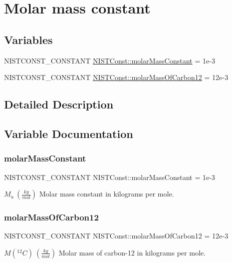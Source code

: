 \hypertarget{group___n_i_s_t_const-_molar_mass_constant}{}\section{Molar mass constant}
\label{group___n_i_s_t_const-_molar_mass_constant}
\subsection*{Variables}
\begin{DoxyCompactItemize}
\item 
N\+I\+S\+T\+C\+O\+N\+S\+T\+\_\+\+C\+O\+N\+S\+T\+A\+NT \mbox{\hyperlink{group___n_i_s_t_const-_molar_mass_constant_gaf82ba48d26910f7aead29d2390058327}{N\+I\+S\+T\+Const\+::molar\+Mass\+Constant}} = 1e-\/3
\item 
N\+I\+S\+T\+C\+O\+N\+S\+T\+\_\+\+C\+O\+N\+S\+T\+A\+NT \mbox{\hyperlink{group___n_i_s_t_const-_molar_mass_constant_gad9065879bcb5df86d887c5c547b7ab17}{N\+I\+S\+T\+Const\+::molar\+Mass\+Of\+Carbon12}} = 12e-\/3
\end{DoxyCompactItemize}


\subsection{Detailed Description}


\subsection{Variable Documentation}
\mbox{\label{group___n_i_s_t_const-_molar_mass_constant_gaf82ba48d26910f7aead29d2390058327}} 
\subsubsection{\texorpdfstring{molar\+Mass\+Constant}{molarMassConstant}}
{\footnotesize\ttfamily N\+I\+S\+T\+C\+O\+N\+S\+T\+\_\+\+C\+O\+N\+S\+T\+A\+NT N\+I\+S\+T\+Const\+::molar\+Mass\+Constant = 1e-\/3}

$M_u \ (\frac{kg}{mol})$ Molar mass constant in kilograms per mole. \mbox{\label{group___n_i_s_t_const-_molar_mass_constant_gad9065879bcb5df86d887c5c547b7ab17}} 
\subsubsection{\texorpdfstring{molar\+Mass\+Of\+Carbon12}{molarMassOfCarbon12}}
{\footnotesize\ttfamily N\+I\+S\+T\+C\+O\+N\+S\+T\+\_\+\+C\+O\+N\+S\+T\+A\+NT N\+I\+S\+T\+Const\+::molar\+Mass\+Of\+Carbon12 = 12e-\/3}

$M({^{12}C}) \ (\frac{kg}{mol})$ Molar mass of carbon-\/12 in kilograms per mole. 